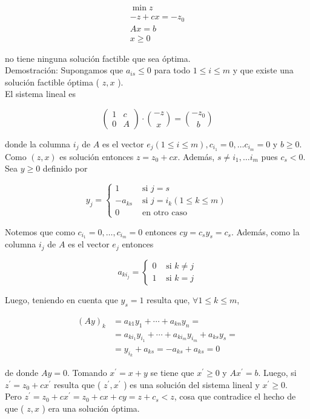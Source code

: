 \documentclass[10pt]{article}
\begin{document}
$$
\begin{gathered}
\min z \\
-z+c x=-z_{0} \\
A x=b \\
x \geq 0
\end{gathered}
$$

no tiene ninguna solución factible que sea óptima.\\
Demostración: Supongamos que $a_{i s} \leq 0$ para todo $1 \leq i \leq m$ y que existe una solución factible óptima ( $z, x$ ).\\
El sistema lineal es

$$
\left(\begin{array}{cc}
1 & c \\
0 & A
\end{array}\right) \cdot\binom{-z}{x}=\binom{-z_{0}}{b}
$$

donde la columna $i_{j}$ de $A$ es el vector $e_{j}(1 \leq i \leq m), c_{i_{1}}=0, \ldots c_{i_{m}}=0$ y $b \geq 0$. Como $(z, x)$ es solución entonces $z=z_{0}+c x$. Además, $s \neq i_{1}, \ldots i_{m}$ pues $c_{s}<0$.\\
Sea $y \geq 0$ definido por

$$
y_{j}= \begin{cases}1 & \text { si } j=s \\ -a_{k s} & \text { si } j=i_{k}(1 \leq k \leq m) \\ 0 & \text { en otro caso }\end{cases}
$$

Notemos que como $c_{i_{1}}=0, \ldots, c_{i_{m}}=0$ entonces $c y=c_{s} y_{s}=c_{s}$. Además, como la columna $i_{j}$ de $A$ es el vector $e_{j}$ entonces

$$
a_{k i_{j}}= \begin{cases}0 & \text { si } k \neq j \\ 1 & \text { si } k=j\end{cases}
$$

Luego, teniendo en cuenta que $y_{s}=1$ resulta que, $\forall 1 \leq k \leq m$,

$$
\begin{aligned}
(A y)_{k} & =a_{k 1} y_{1}+\cdots+a_{k n} y_{n}= \\
& =a_{k i_{1}} y_{i_{1}}+\cdots+a_{k i_{m}} y_{i_{m}}+a_{k s} y_{s}= \\
& =y_{i_{k}}+a_{k s}=-a_{k s}+a_{k s}=0
\end{aligned}
$$

de donde $A y=0$. Tomando $x^{\prime}=x+y$ se tiene que $x^{\prime} \geq 0$ y $A x^{\prime}=b$. Luego, si $z^{\prime}=z_{0}+c x^{\prime}$ resulta que ( $z^{\prime}, x^{\prime}$ ) es una solución del sistema lineal y $x^{\prime} \geq 0$.\\
Pero $z^{\prime}=z_{0}+c x^{\prime}=z_{0}+c x+c y=z+c_{s}<z$, cosa que contradice el hecho de que ( $z, x$ ) era una solución óptima.
\end{document}
